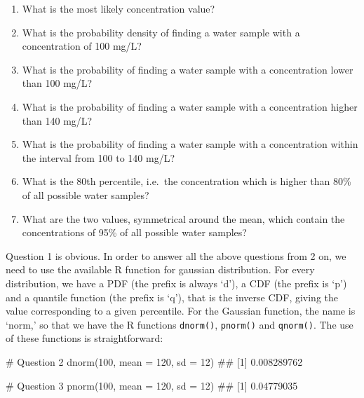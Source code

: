 \documentclass[a4paper,12pt,oneside]{book}
\providecommand{\tightlist}{%
  \setlength{\itemsep}{0pt}\setlength{\parskip}{0pt}}
\newenvironment{Shaded}{\begin{snugshade}}{\end{snugshade}}
\newcommand{\DecValTok}[1]{#1}
\newcommand{\CommentTok}[1]{#1}
\newcommand{\DocumentationTok}[1]{#1}
\newcommand{\FunctionTok}[1]{#1}
\newcommand{\AttributeTok}[1]{#1}
\newcommand{\NormalTok}[1]{#1}
\begin{document}
\begin{enumerate}
\def\labelenumi{\arabic{enumi}.}
\tightlist
\item
  What is the most likely concentration value?
\item
  What is the probability density of finding a water sample with a concentration of 100 mg/L?
\item
  What is the probability of finding a water sample with a concentration lower than 100 mg/L?
\item
  What is the probability of finding a water sample with a concentration higher than 140 mg/L?
\item
  What is the probability of finding a water sample with a concentration within the interval from 100 to 140 mg/L?
\item
  What is the 80th percentile, i.e.~the concentration which is higher than 80\% of all possible water samples?
\item
  What are the two values, symmetrical around the mean, which contain the concentrations of 95\% of all possible water samples?
\end{enumerate}

Question 1 is obvious. In order to answer all the above questions from 2 on, we need to use the available R function for gaussian distribution. For every distribution, we have a PDF (the prefix is always `d'), a CDF (the prefix is `p') and a quantile function (the prefix is `q'), that is the inverse CDF, giving the value corresponding to a given percentile. For the Gaussian function, the name is `norm,' so that we have the R functions \texttt{dnorm()}, \texttt{pnorm()} and \texttt{qnorm()}. The use of these functions is straightforward:

\begin{Shaded}
\begin{Highlighting}[]
\CommentTok{\# Question 2}
\FunctionTok{dnorm}\NormalTok{(}\DecValTok{100}\NormalTok{, }\AttributeTok{mean =} \DecValTok{120}\NormalTok{, }\AttributeTok{sd =} \DecValTok{12}\NormalTok{)}
\DocumentationTok{\#\# [1] 0.008289762}
\end{Highlighting}
\end{Shaded}

\begin{Shaded}
\begin{Highlighting}[]
\CommentTok{\# Question 3}
\FunctionTok{pnorm}\NormalTok{(}\DecValTok{100}\NormalTok{, }\AttributeTok{mean =} \DecValTok{120}\NormalTok{, }\AttributeTok{sd =} \DecValTok{12}\NormalTok{)}
\DocumentationTok{\#\# [1] 0.04779035}
\end{Highlighting}
\end{Shaded}
\end{document}
